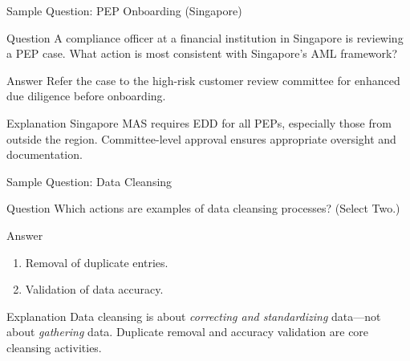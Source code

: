 \documentclass{beamer}
\begin{document}
	\begin{frame}{Sample Question: PEP Onboarding (Singapore)}
		\begin{block}{Question}
			A compliance officer at a financial institution in Singapore is reviewing a PEP case. What action is most consistent with Singapore's AML framework?
		\end{block}
		\begin{block}{Answer}
			Refer the case to the high-risk customer review committee for enhanced due diligence before onboarding.
		\end{block}
		\begin{alertblock}{Explanation}
			Singapore MAS requires EDD for all PEPs, especially those from outside the region. Committee-level approval ensures appropriate oversight and documentation.
		\end{alertblock}
	\end{frame}
	
	\begin{frame}{Sample Question: Data Cleansing}
		\begin{block}{Question}
			Which actions are examples of data cleansing processes? (Select Two.)
		\end{block}
		\begin{block}{Answer}
			\begin{enumerate}
				\item Removal of duplicate entries.
				\item Validation of data accuracy.
			\end{enumerate}
		\end{block}
		\begin{alertblock}{Explanation}
			Data cleansing is about \textit{correcting and standardizing} data—not about \textit{gathering} data. Duplicate removal and accuracy validation are core cleansing activities.
		\end{alertblock}
	\end{frame}
	
\end{document}
